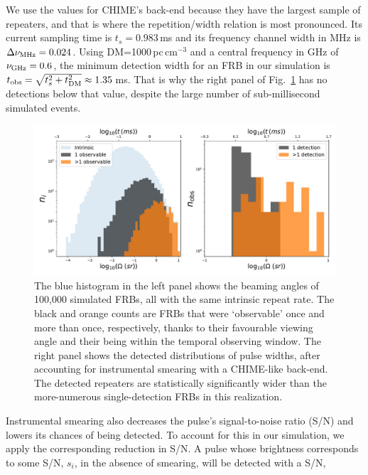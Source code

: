 \documentclass[fleqn,usenatbib]{mnras}
\begin{document}
\noindent We use the values for CHIME's back-end because they have the 
largest sample of repeaters, and that is where the repetition/width 
relation is most pronounced. Its 
current sampling time is $t_s=0.983$\,ms and its frequency channel width 
in MHz is $\Delta\nu_{\rm MHz}=0.024$. Using DM=1000\,pc\,cm$^{-3}$ 
and a central frequency in GHz of $\nu_{\rm GHz}=0.6$, the minimum 
detection width for an FRB in our simulation is 
$t_{\rm obs}=\sqrt{t^2_s + t^2_{\rm DM}}\approx1.35$\,ms. That is why the 
right panel of Fig.~\ref{fig-MC} has no detections below that value, despite 
the large number of sub-millisecond simulated events. 

\begin{figure}
	\centering
	\includegraphics[scale=0.5]{observed_widths_beaming.pdf}
	\caption{The blue histogram in the left panel shows the beaming angles of 100,000 simulated 
	        FRBs, all with the same intrinsic repeat rate. The black and orange counts 
	        are FRBs that were `observable' once and more than once, respectively, thanks to 
	        their favourable viewing angle and their being within the temporal observing window. The right panel 
	        shows the detected distributions of pulse widths, after accounting for 
	        instrumental smearing with a 
	        CHIME-like back-end. The detected repeaters are statistically significantly wider than the 
	        more-numerous single-detection FRBs in this realization.}
	 \label{fig-MC}
\end{figure}

Instrumental smearing also decreases the pulse's signal-to-noise ratio (S/N) 
and lowers its chances of being detected. To account for this in our simulation, we apply 
the corresponding reduction in S/N. A pulse whose brightness corresponds to some S/N, $s_i$,
in the absence of smearing, will be detected with a S/N,
\end{document}
